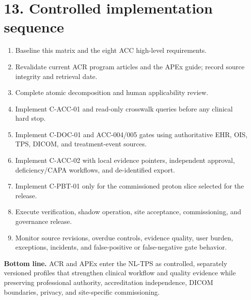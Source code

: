 \documentclass[11pt,letterpaper]{article}
\begin{document}
\section{13. Controlled implementation sequence}

\begin{enumerate}
\item Baseline this matrix and the eight ACC high-level requirements.
\item Revalidate current ACR program articles and the APEx guide; record source integrity and retrieval date.
\item Complete atomic decomposition and human applicability review.
\item Implement C-ACC-01 and read-only crosswalk queries before any clinical hard stop.
\item Implement C-DOC-01 and ACC-004/005 gates using authoritative EHR, OIS, TPS, DICOM, and treatment-event sources.
\item Implement C-ACC-02 with local evidence pointers, independent approval, deficiency/CAPA workflows, and de-identified export.
\item Implement C-PBT-01 only for the commissioned proton slice selected for the release.
\item Execute verification, shadow operation, site acceptance, commissioning, and governance release.
\item Monitor source revisions, overdue controls, evidence quality, user burden, exceptions, incidents, and false-positive or false-negative gate behavior.
\end{enumerate}

\textbf{Bottom line. }ACR and APEx enter the NL-TPS as controlled, separately versioned profiles that strengthen clinical workflow and quality evidence while preserving professional authority, accreditation independence, DICOM boundaries, privacy, and site-specific commissioning.
\end{document}
